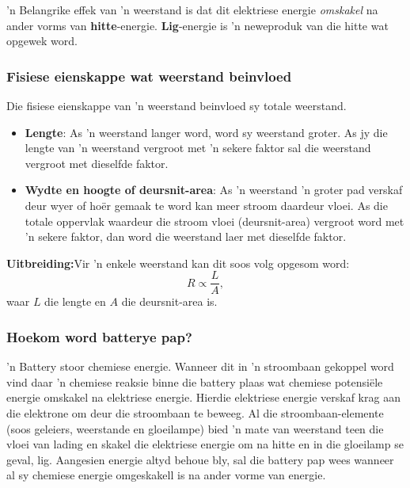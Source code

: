  'n Belangrike effek van  'n weerstand is dat dit elektriese energie
\textit{omskakel} na ander vorms van \textbf{hitte}-energie.
\textbf{Lig}-energie is  'n neweproduk van die hitte wat opgewek word.


\subsubsection{Fisiese eienskappe wat weerstand beinvloed}

Die fisiese eienskappe van  'n weerstand beinvloed sy totale weerstand.
\begin{itemize}
 \item \textbf{Lengte}: As  'n weerstand langer word, word sy weerstand groter.
As jy die lengte van  'n weerstand vergroot met  'n sekere faktor sal die
weerstand vergroot met dieselfde faktor.
\item \textbf{Wydte en hoogte of deursnit-area}: As  'n weerstand  'n groter pad
verskaf deur wyer of ho\"er gemaak te word kan meer stroom daardeur vloei. As
die totale oppervlak waardeur die stroom vloei (deursnit-area) vergroot word
met  'n sekere faktor, dan word die weerstand laer met dieselfde faktor.
\end{itemize}
\textbf{Uitbreiding:}Vir  'n enkele weerstand kan dit soos volg opgesom word:
\begin{equation*}
 R\propto\frac{L}{A},
\end{equation*} waar $L$ die lengte en $A$ die deursnit-area is.

\subsubsection*{Hoekom word batterye pap?}
 'n Battery stoor chemiese energie. Wanneer dit in  'n stroombaan gekoppel word
vind daar  'n chemiese reaksie binne die battery plaas wat chemiese
potensi\"ele energie omskakel na elektriese energie. Hierdie elektriese energie
verskaf krag aan die elektrone om deur die stroombaan te beweeg. Al die
stroombaan-elemente (soos geleiers, weerstande en gloeilampe) bied  'n mate van
weerstand teen die vloei van lading en skakel die elektriese energie om na
hitte en in die gloeilamp se geval, lig.
Aangesien energie altyd behoue bly, sal die battery pap wees wanneer al sy
chemiese energie omgeskakell is na ander vorme van energie.

